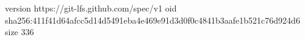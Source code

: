 version https://git-lfs.github.com/spec/v1
oid sha256:411f41d64afcc5d14d5491eba4e469e91d3d0f0c4841b3aafe1b521c76d924d6
size 336

